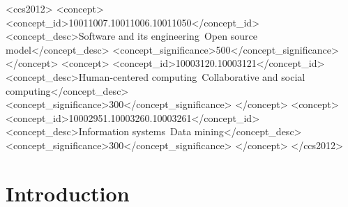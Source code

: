 \documentclass[sigconf,screen]{acmart}
\begin{document}
\begin{abstract}
unilateral decisions, gatekeeping and incivility fall by a third while procedural control doubles and corporate-interest references rise, with Steering Council members showing the lowest unilateral and gatekeeping shares of any role and the highest procedural and backchannel shares. A year-by-year timeline of the highest-scoring decision-closing sentences, nominated by the tool, traces the change in the language of decision from personal pronouncement (2001--2009) through delegation (2010--2017) to the council's collective and procedural formulas (2019--2026). We also document two data-quality problems in the shared corpus that any tool built on it must handle. The contribution is a taxonomy of twenty mechanisms, an open pipeline that produces annotation-ready output, and a first empirical baseline against which validated classifiers and a planned Bitcoin comparison can be measured.
\end{abstract}

\begin{CCSXML}
<ccs2012>
 <concept>
  <concept_id>10011007.10011006.10011050</concept_id>
  <concept_desc>Software and its engineering~Open source model</concept_desc>
  <concept_significance>500</concept_significance>
 </concept>
 <concept>
  <concept_id>10003120.10003121</concept_id>
  <concept_desc>Human-centered computing~Collaborative and social computing</concept_desc>
  <concept_significance>300</concept_significance>
 </concept>
 <concept>
  <concept_id>10002951.10003260.10003261</concept_id>
  <concept_desc>Information systems~Data mining</concept_desc>
  <concept_significance>300</concept_significance>
 </concept>
</ccs2012>
\end{CCSXML}



\maketitle

\section{Introduction}
\end{document}

